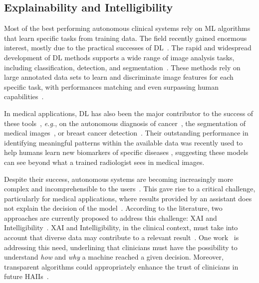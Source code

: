 \subsection{Explainability and Intelligibility}
\label{sec:sec006002001}

Most of the best performing autonomous clinical systems rely on \ac{ML} algorithms that learn specific tasks from training data.
The field recently gained enormous interest, mostly due to the practical successes of \ac{DL}~\cite{meacham2019towards}.
The rapid and widespread development of \ac{DL} methods supports a wide range of image analysis tasks, including classification, detection, and segmentation~\cite{lecun2015deep}.
These methods rely on large annotated data sets to learn and discriminate image features for each specific task, with performances matching and even surpassing human capabilities~\cite{esteva2017dermatologist}.

In medical applications, \ac{DL} has also been the major contributor to the success of these tools~\cite{esteva2019guide}, \textit{e.g.}, on the autonomous diagnosis of cancer~\cite{esteva2017dermatologist}, the segmentation of medical images~\cite{medley2019segmenting}, or breast cancer detection~\cite{MAICAS2019101562}.
Their outstanding performance in identifying meaningful patterns within the available data was recently used to help humans learn new biomarkers of specific diseases \cite{cole2017predicting,gonzalez2018deep,wang2019deep}, suggesting these models can see beyond what a trained radiologist sees in medical images.

Despite their success, autonomous systems are becoming increasingly more complex and incomprehensible to the users~\cite{holzinger2019causability}.
This gave rise to a critical challenge, particularly for medical applications, where results provided by an assistant does not explain the decision of the model~\cite{shah2019artificial}.
According to the literature, two approaches are currently proposed to address this challenge: \ac{XAI} and Intelligibility~\cite{gunning2017explainable, miller2018explanation}.
\ac{XAI} and Intelligibility, in the clinical context, must take into account that diverse data may contribute to a relevant result~\cite{Bharadhwaj:2019:ERS:3308557.3308699}.
One work~\cite{holzinger2018current} is addressing this need, underlining that clinicians must have the possibility to understand {\it how} and {\it why} a machine reached a given decision.
Moreover, transparent algorithms could appropriately enhance the trust of clinicians in future \acp{HAII}~\cite{Dominguez:2019:EEA:3301275.3302274, Weisz:2019:BTS:3301275.3302290}.

